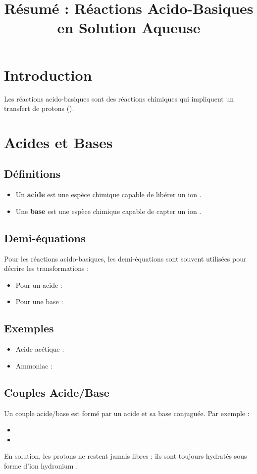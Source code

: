 \documentclass[12pt]{article}
\title{Résumé : Réactions Acido-Basiques en Solution Aqueuse}
\author{}
\date{}
\begin{document}
\maketitle

\section{Introduction}
Les réactions acido-basiques sont des réactions chimiques qui impliquent un transfert de protons ().

\section{Acides et Bases}
\subsection{Définitions}
\begin{itemize}
    \item Un \textbf{acide} est une espèce chimique capable de libérer un ion .
    \item Une \textbf{base} est une espèce chimique capable de capter un ion .
\end{itemize}

\subsection{Demi-équations}
Pour les réactions acido-basiques, les demi-équations sont souvent utilisées pour décrire les transformations :
\begin{itemize}
    \item Pour un acide : 
    \item Pour une base : 
\end{itemize}

\subsection{Exemples}
\begin{itemize}
    \item Acide acétique : 
    \item Ammoniac : 
\end{itemize}

\subsection{Couples Acide/Base}
Un couple acide/base est formé par un acide et sa base conjuguée. Par exemple :
\begin{itemize}
    \item {}
    \item {}
\end{itemize}
En solution, les protons  ne restent jamais libres : ils sont toujours hydratés sous forme d'ion hydronium .
\end{document}
